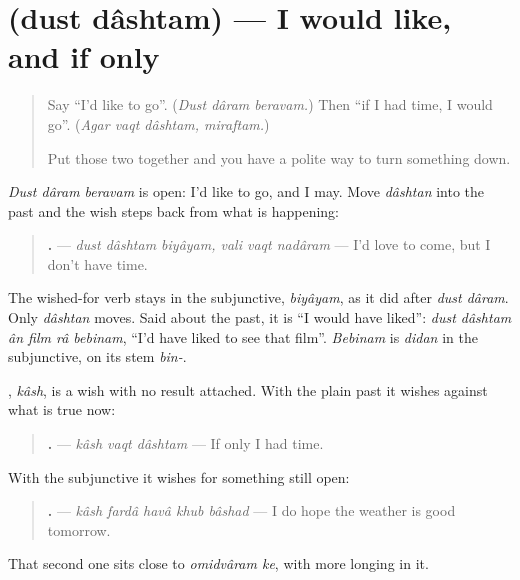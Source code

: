 \section[\texorpdfstring{\fa{دوست} \fa{داشتم} (dust dâshtam)}{دوست داشتم (dust dâshtam)}]{  (dust dâshtam) — I would like, and if only}

\label{lesson:FA-C299-dust-dashtam}



\begin{quote}
Say \textquotedblleft{}I'd like to go\textquotedblright{}. (\emph{Dust dâram beravam.}) Then \textquotedblleft{}if I had time, I would go\textquotedblright{}. (\emph{Agar vaqt dâshtam, miraftam.})

Put those two together and you have a polite way to turn something down.
\end{quote}

\begin{grammarlens}[title={Grammar Lens: dust dâshtam, for a wish held back}]
\emph{Dust dâram beravam} is open: I'd like to go, and I may. Move \emph{dâshtan} into the past and the wish steps back from what is happening:

\begin{quote}
\textbf{     .} — \emph{dust dâshtam biyâyam, vali vaqt nadâram} — I'd love to come, but I don't have time.
\end{quote}

The wished-for verb stays in the subjunctive, \emph{biyâyam}, as it did after \emph{dust dâram}. Only \emph{dâshtan} moves. Said about the past, it is \textquotedblleft{}I would have liked\textquotedblright{}: \emph{dust dâshtam ân film râ bebinam}, \textquotedblleft{}I'd have liked to see that film\textquotedblright{}. \emph{Bebinam} is \emph{didan} in the subjunctive, on its stem \emph{bin-}.
\end{grammarlens}

\begin{grammarlens}[title={Grammar Lens: kâsh, \textquotedblleft{}if only\textquotedblright{}}]
\textbf{}, \emph{kâsh}, is a wish with no result attached. With the plain past it wishes against what is true now:

\begin{quote}
\textbf{  .} — \emph{kâsh vaqt dâshtam} — If only I had time.
\end{quote}

With the subjunctive it wishes for something still open:

\begin{quote}
\textbf{    .} — \emph{kâsh fardâ havâ khub bâshad} — I do hope the weather is good tomorrow.
\end{quote}

That second one sits close to \emph{omidvâram ke}, with more longing in it.
\end{grammarlens}

